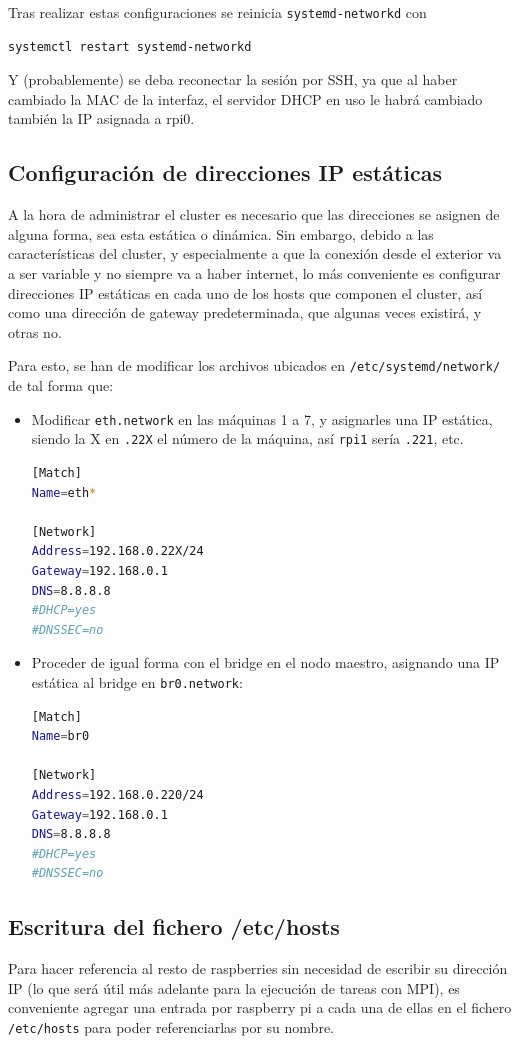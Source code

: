 Tras realizar estas configuraciones se reinicia \texttt{systemd-networkd} con
\begin{lstlisting}[language=bash]
systemctl restart systemd-networkd
\end{lstlisting}

Y (probablemente) se deba reconectar la sesión por SSH, ya que al haber cambiado la MAC de la interfaz, el servidor DHCP en uso le habrá cambiado también la IP asignada a rpi0.

\subsection{Configuración de direcciones IP estáticas}
\label{ssec:configuracion_ip_estaticas}
A la hora de administrar el cluster es necesario que las direcciones se asignen de alguna forma, sea esta estática o dinámica. Sin embargo, debido a las características del cluster, y especialmente a que la conexión desde el exterior va a ser variable y no siempre va a haber internet, lo más conveniente es configurar direcciones IP estáticas en cada uno de los hosts que componen el cluster, así como una dirección de gateway predeterminada, que algunas veces existirá, y otras no.

Para esto, se han de modificar los archivos ubicados en \texttt{/etc/systemd/network/} de tal forma que:

\begin{itemize}
    \item Modificar \texttt{eth.network} en las máquinas 1 a 7, y asignarles una IP estática, siendo la X en \texttt{.22X} el número de la máquina, así \texttt{rpi1} sería \texttt{.221}, etc.
\begin{lstlisting}[language=bash]
[Match]
Name=eth*

[Network]
Address=192.168.0.22X/24
Gateway=192.168.0.1
DNS=8.8.8.8
#DHCP=yes
#DNSSEC=no
\end{lstlisting}
    \item Proceder de igual forma con el bridge en el nodo maestro, asignando una IP estática al bridge en \texttt{br0.network}:
\begin{lstlisting}[language=bash]
[Match]
Name=br0

[Network]
Address=192.168.0.220/24
Gateway=192.168.0.1
DNS=8.8.8.8
#DHCP=yes
#DNSSEC=no
\end{lstlisting}
\end{itemize}

\subsection{Escritura del fichero /etc/hosts}
Para hacer referencia al resto de raspberries sin necesidad de escribir su dirección IP (lo que será útil más adelante para la ejecución de tareas con MPI), es conveniente agregar una entrada por raspberry pi a cada una de ellas en el fichero \texttt{/etc/hosts} para poder referenciarlas por su nombre.

